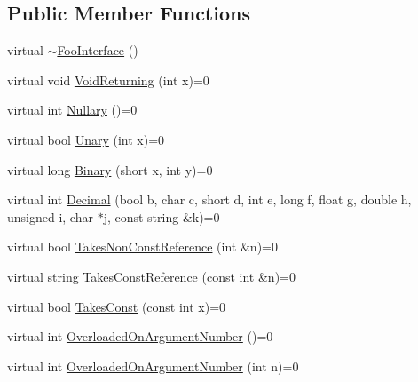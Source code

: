 \subsection*{Public Member Functions}
\begin{DoxyCompactItemize}
\item 
virtual \hyperlink{classtesting_1_1gmock__generated__function__mockers__test_1_1_foo_interface_ad4eb4709c9ae9b1cdaded8d05567cdbb}{$\sim$\+Foo\+Interface} ()
\item 
virtual void \hyperlink{classtesting_1_1gmock__generated__function__mockers__test_1_1_foo_interface_adf968115cf1260004d8abe372dc71c85}{Void\+Returning} (int x)=0
\item 
virtual int \hyperlink{classtesting_1_1gmock__generated__function__mockers__test_1_1_foo_interface_a633e753eafa7f82dde22ecf9492f341c}{Nullary} ()=0
\item 
virtual bool \hyperlink{classtesting_1_1gmock__generated__function__mockers__test_1_1_foo_interface_ae0885ac29bc4a3f180f6573d8b1a341e}{Unary} (int x)=0
\item 
virtual long \hyperlink{classtesting_1_1gmock__generated__function__mockers__test_1_1_foo_interface_a59ea28b711ece054ce9d57c2dc574ba0}{Binary} (short x, int y)=0
\item 
virtual int \hyperlink{classtesting_1_1gmock__generated__function__mockers__test_1_1_foo_interface_a5c5886880581d8dd420c9a187ff884b2}{Decimal} (bool b, char c, short d, int e, long f, float g, double h, unsigned i, char $\ast$j, const string \&k)=0
\item 
virtual bool \hyperlink{classtesting_1_1gmock__generated__function__mockers__test_1_1_foo_interface_a694354adfffcee58093298bc12182ff5}{Takes\+Non\+Const\+Reference} (int \&n)=0
\item 
virtual string \hyperlink{classtesting_1_1gmock__generated__function__mockers__test_1_1_foo_interface_a3db03c9698ecddfc62f2a1ed2f3c32c2}{Takes\+Const\+Reference} (const int \&n)=0
\item 
virtual bool \hyperlink{classtesting_1_1gmock__generated__function__mockers__test_1_1_foo_interface_a8c53e87edf0b9da878e5259f02b7f5dc}{Takes\+Const} (const int x)=0
\item 
virtual int \hyperlink{classtesting_1_1gmock__generated__function__mockers__test_1_1_foo_interface_ae9e86ac64fa9acedfb1fa747174c7f43}{Overloaded\+On\+Argument\+Number} ()=0
\item 
virtual int \hyperlink{classtesting_1_1gmock__generated__function__mockers__test_1_1_foo_interface_a1b5ff8cc745af475e0abba5d2858e1c9}{Overloaded\+On\+Argument\+Number} (int n)=0

\end{DoxyCompactItemize}
